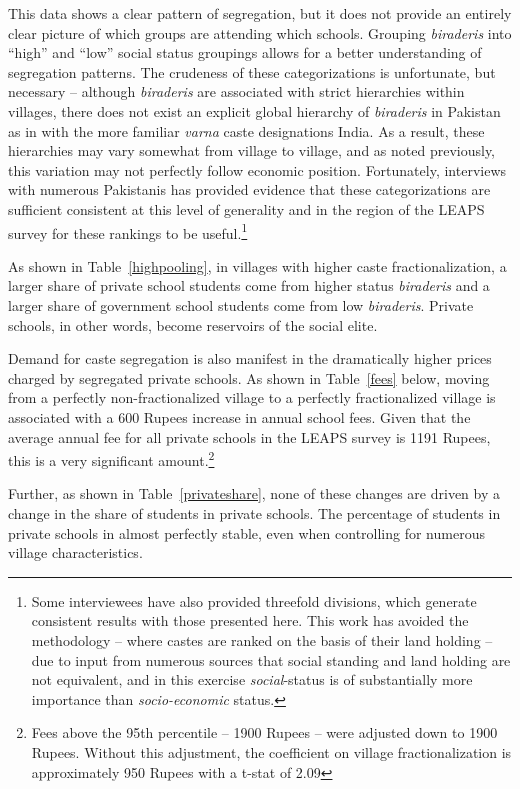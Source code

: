 \documentclass[Eubank_pk_ethnic_sorting.tex]{subfiles}
\begin{document}
This data shows a clear pattern of segregation, but it does not provide an entirely clear picture of which groups are attending which schools.  Grouping \emph{biraderis} into ``high'' and ``low'' social status groupings allows for a better understanding of segregation patterns. The crudeness of these categorizations is unfortunate, but necessary -- although \emph{biraderis} are associated with strict hierarchies within villages, there does not exist an explicit global hierarchy of \emph{biraderis} in Pakistan as in with the more familiar \emph{varna} caste designations India. As a result, these hierarchies may vary somewhat from village to village, and as noted previously, this variation may not perfectly follow economic position. Fortunately, interviews with numerous Pakistanis has provided evidence that these categorizations are sufficient consistent at this level of generality and in the region of the LEAPS survey for these rankings to be useful.\footnote{Some interviewees have also provided threefold divisions, which generate consistent results with those presented here. This work has avoided the \cite{Jacoby:2011tc} methodology -- where castes are ranked on the basis of their land holding -- due to input from numerous sources that social standing and land holding are not equivalent, and in this exercise \emph{social}-status is of substantially more importance than \emph{socio-economic} status.}

As shown in Table~\ref{highpooling}, in villages with higher caste fractionalization, a larger share of private school students come from higher status \emph{biraderis} and a larger share of government school students come from low \emph{biraderis}. Private schools, in other words, become reservoirs of the social elite. 




Demand for caste segregation is also manifest in the dramatically higher prices charged by segregated private schools. As shown in Table~\ref{fees} below, moving from a perfectly non-fractionalized village to a perfectly fractionalized village is associated with a 600 Rupees increase in annual school fees. Given that the average annual fee for all private schools in the LEAPS survey is 1191 Rupees, this is a very significant amount.\footnote{Fees above the 95th percentile -- 1900 Rupees -- were adjusted down to 1900 Rupees. Without this adjustment, the coefficient on village fractionalization is approximately 950 Rupees with a t-stat of 2.09} 



Further, as shown in Table~\ref{privateshare}, none of these changes are driven by a change in the share of students in private schools. The percentage of students in private schools in almost perfectly stable, even when controlling for numerous village characteristics. 


\end{document}

